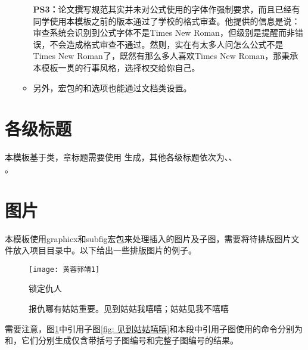 \documentclass[print, doctor, vlined]{DissertUESTC}
\begin{document}
\begin{itemize}
\begin{itemize}
			\textbf{PS3：}论文撰写规范其实并未对公式使用的字体作强制要求，而且已经有同学使用本模板之前的版本通过了学校的格式审查。他提供的信息是说：审查系统会识别到公式字体不是Times New Roman，但级别是提醒而非错误，不会造成格式审查不通过。然则，实在有太多人问怎么公式不是Times New Roman了，既然有那么多人喜欢Times New Roman，那秉承本模板一贯的行事风格，选择权交给你自己。

			\item 另外，\href{https://mirrors.sustech.edu.cn/CTAN/macros/latex/contrib/algorithm2e/doc/algorithm2e.pdf}{}宏包的和选项也能通过文档类设置。
		\end{itemize}
	\end{itemize}
	
	\section{各级标题}
	
	本模板基于类，章标题需要使用 生成，其他各级标题依次为、、\\ 。
	
	\section{图片}
	
	本模板使用graphicx和subfig宏包来处理插入的图片及子图，需要将待排版图片文件放入项目目录中。以下给出一些排版图片的例子。
	
	\begin{figure}[!htb]
		\centering
		\texttt{[image: 黄蓉郭靖1]}
		\caption{锁定仇人}
	\end{figure}
	
	\begin{figure}[!htb]
		\centering
		\hfill
		\caption[报仇哪有姑姑重要]{报仇哪有姑姑重要。见到姑姑我嘻嘻；姑姑见我不嘻嘻} \label{fig: 报仇哪有姑姑重要}
	\end{figure}
	

	需要注意，图\ref{fig: 报仇哪有姑姑重要}中引用子图\ref{fig: 见到姑姑嘻嘻}和本段中引用子图使用的命令分别为和，它们分别生成仅含带括号子图编号和完整子图编号的结果。
	
\end{document}
